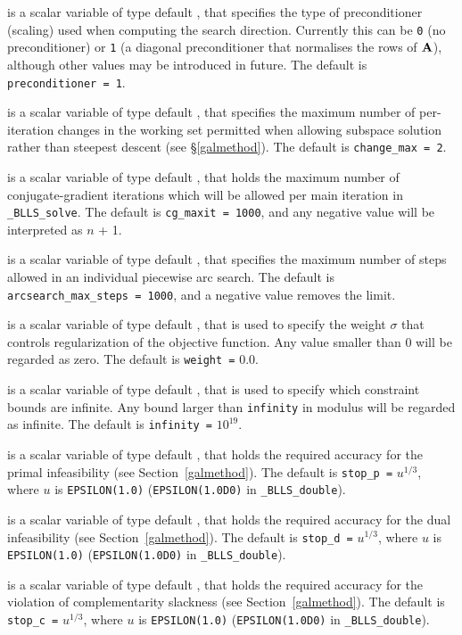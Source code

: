 \documentclass{galahad}
\newcommand{\packagename}{BLLS}
\newcommand{\fullpackagename}{\libraryname\_\packagename}
\newcommand{\solver}{{\tt \fullpackagename\_solve}}
\begin{document}
\begin{description}
 is a scalar variable of type default \integer, that
specifies the type of preconditioner (scaling) used when computing the
search direction. Currently this can
be {\tt 0} (no preconditioner) or {\tt 1} (a diagonal preconditioner
that normalises the rows of ${\mathbf{A}}$), although other values may be introduced
in future. The default is {\tt preconditioner = 1}.

 is a scalar variable of type default \integer, that
specifies the maximum number of per-iteration changes in the working set
permitted when allowing subspace solution rather than steepest descent
(see \S\ref{galmethod}).
The default is {\tt change\_max = 2}.

 is a scalar variable of type default \integer, that holds the
maximum number of conjugate-gradient iterations which will be allowed
per main iteration in \solver.
The default is {\tt cg\_maxit = 1000}, and any negative value will
be interpreted as $n$ + 1.

 is a scalar variable of type default \integer,
that specifies the maximum number of steps allowed in an individual
piecewise arc search.
The default is {\tt arcsearch\_max\_steps = 1000}, and a negative value
removes the limit.

 is a scalar variable of type default \realdp, that is used to
specify the weight $\sigma$ that controls regularization of the objective 
function. Any value smaller than $0$ will be regarded as zero.
The default is {\tt weight =} $0.0$.

 is a scalar variable of type default \realdp, that is used to
specify which constraint bounds are infinite.
Any bound larger than {\tt infinity} in modulus will be regarded as infinite.
The default is {\tt infinity =} $10^{19}$.

 is a scalar variable of type default \realdp, that holds the
required accuracy for the primal infeasibility (see Section~\ref{galmethod}).
The default is {\tt stop\_p =} $u^{1/3}$,
where $u$ is {\tt EPSILON(1.0)} ({\tt EPSILON(1.0D0)} in
{\tt \fullpackagename\_double}).

 is a scalar variable of type default
\realdp, that holds the
required accuracy for the dual infeasibility (see Section~\ref{galmethod}).
The default is {\tt stop\_d =} $u^{1/3}$,
where $u$ is {\tt EPSILON(1.0)} ({\tt EPSILON(1.0D0)} in
{\tt \fullpackagename\_double}).

 is a scalar variable of type default
\realdp, that holds the
required accuracy for the violation of complementarity slackness
(see Section~\ref{galmethod}).
The default is {\tt stop\_c =} $u^{1/3}$,
where $u$ is {\tt EPSILON(1.0)} ({\tt EPSILON(1.0D0)} in
{\tt \fullpackagename\_double}).


\end{description}
\end{document}
